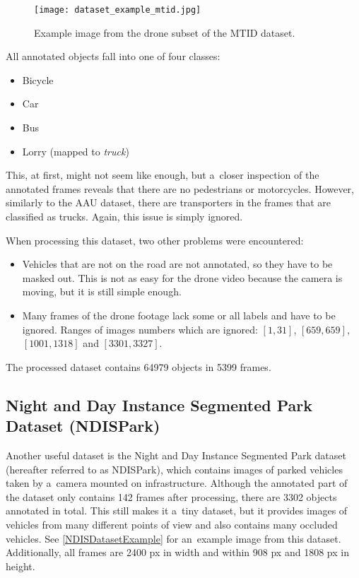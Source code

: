 \begin{figure}[t]
    \centering
    \texttt{[image: dataset\_example\_mtid.jpg]}
    \captionsetup{width=0.8\textwidth}
    \caption{Example image from the drone subset of the MTID dataset.}
    \label{MTIDDatasetExample}
\end{figure}

All annotated objects fall into one of four classes:
\begin{itemize}
    \item Bicycle
    \item Car
    \item Bus
    \item Lorry (mapped to \textit{truck})
\end{itemize}
This, at first, might not seem like enough, but a~closer inspection of the
annotated frames reveals that there are no pedestrians or motorcycles. However,
similarly to the AAU dataset, there are transporters in the frames
that are classified as trucks. Again, this issue is simply ignored.

When processing this dataset, two other problems were encountered:
\begin{itemize}
    \item Vehicles that are not on the road are not annotated, so they have to
    be masked out. This is not as easy for the drone video because the camera is
    moving, but it is still simple enough.
    \item Many frames of the drone footage lack some or all labels and have to
    be ignored. Ranges of images numbers which are ignored: $[1,31]$,
    $[659,659]$, $[1001,1318]$ and $[3301,3327]$.
\end{itemize}
The processed dataset contains \num{64979} objects in \num{5399} frames.


\subsection{Night and Day Instance Segmented Park Dataset (NDISPark)}

Another useful dataset is the Night and Day Instance Segmented Park
dataset~\cite{Luca2022} (hereafter referred to as NDISPark), which contains
images of parked vehicles taken by a~camera mounted on infrastructure. Although
the annotated part of the dataset only contains \num{142} frames after
processing, there are \num{3302} objects annotated in total. This still makes it
a~tiny dataset, but it provides images of vehicles from many different points of
view and also contains many occluded vehicles. See \autoref{NDISDatasetExample}
for an~example image from this dataset. Additionally, all frames are \num{2400}
px in width and within \num{908} px and \num{1808} px in height.


